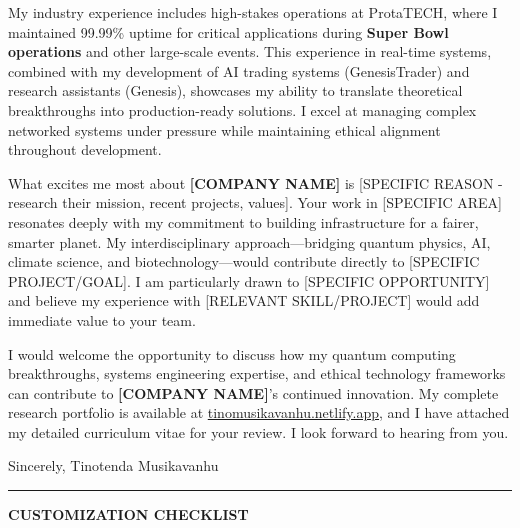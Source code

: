 \documentclass[11pt, letterpaper]{article}
\newcommand{\company}[1]{\textbf{#1}}
\newcommand{\highlight}[1]{\textbf{\color{harvardcrimson}#1}}
\newcommand{\closing}[1]{
  \vspace{12pt}
  Sincerely,
  \vspace{24pt}
  #1
}
\begin{document}
My industry experience includes high-stakes operations at ProtaTECH, where I maintained 99.99\% uptime for critical applications during \highlight{Super Bowl operations} and other large-scale events. This experience in real-time systems, combined with my development of AI trading systems (GenesisTrader) and research assistants (Genesis), showcases my ability to translate theoretical breakthroughs into production-ready solutions. I excel at managing complex networked systems under pressure while maintaining ethical alignment throughout development.

What excites me most about \company{[COMPANY NAME]} is [SPECIFIC REASON - research their mission, recent projects, values]. Your work in [SPECIFIC AREA] resonates deeply with my commitment to building infrastructure for a fairer, smarter planet. My interdisciplinary approach—bridging quantum physics, AI, climate science, and biotechnology—would contribute directly to [SPECIFIC PROJECT/GOAL]. I am particularly drawn to [SPECIFIC OPPORTUNITY] and believe my experience with [RELEVANT SKILL/PROJECT] would add immediate value to your team.

I would welcome the opportunity to discuss how my quantum computing breakthroughs, systems engineering expertise, and ethical technology frameworks can contribute to \company{[COMPANY NAME]}'s continued innovation. My complete research portfolio is available at \href{https://tinomusikavanhu.netlify.app}{tinomusikavanhu.netlify.app}, and I have attached my detailed curriculum vitae for your review. I look forward to hearing from you.

\closing{Tinotenda Musikavanhu}

\vspace{20pt}
\hrule
\vspace{10pt}

\begin{center}
\textcolor{harvardcrimson}{\textbf{CUSTOMIZATION CHECKLIST}}
\end{center}
\end{document}
